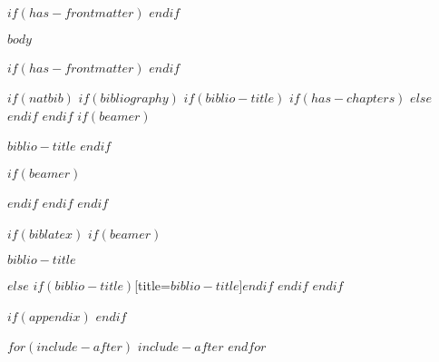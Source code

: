 \documentclass[
$if(fontsize)$
  $fontsize$,
$endif$
$if(papersize)$
  $papersize$paper,
$else$
  paper=a4,
$endif$
$if(beamer)$
  ignorenonframetext,
$if(handout)$
  handout,
$endif$
$if(aspectratio)$
  aspectratio=$aspectratio$,
$endif$
$endif$
$for(classoption)$
  $classoption$$sep$,
$endfor$
  ,captions=tableheading
]{$if(beamer)$$documentclass$$else$$if(book)$scrbook$else$scrartcl$endif$$endif$}
\newif\ifbibliography
\begin{document}
$if(has-frontmatter)$
\mainmatter
$endif$

$body$

$if(has-frontmatter)$
\backmatter
$endif$

$if(natbib)$
$if(bibliography)$
$if(biblio-title)$
$if(has-chapters)$
\renewcommand\bibname{$biblio-title$}
$else$
\renewcommand\refname{$biblio-title$}
$endif$
$endif$
$if(beamer)$
\begin{frame}[allowframebreaks]{$biblio-title$}
	\bibliographytrue
	$endif$
	
	$if(beamer)$
\end{frame}
$endif$
$endif$
$endif$

$if(biblatex)$
$if(beamer)$
\begin{frame}[allowframebreaks]{$biblio-title$}
	\bibliographytrue
	\printbibliography[heading=none]
\end{frame}
$else$
\printbibliography$if(biblio-title)$[title=$biblio-title$]$endif$
$endif$
$endif$

$if(appendix)$
\newpage
\appendix
$endif$

$for(include-after)$
$include-after$
$endfor$
\end{document}
